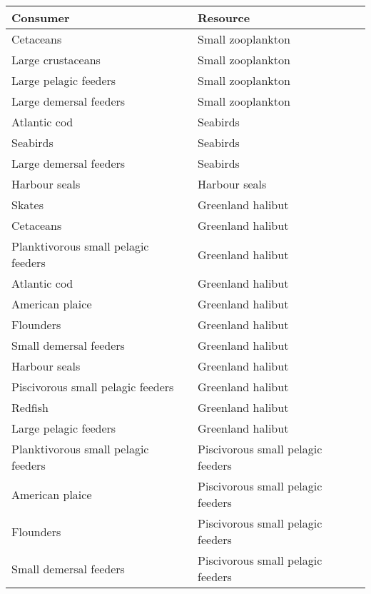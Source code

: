 \begin{table}[h!]
  \centering
  \begin{tabular}{|l|l|}
      \hline
      Consumer               & Resource \\
      \hline    \hline
      Cetaceans                           & Small zooplankton \\
      Large crustaceans                   & Small zooplankton \\
      Large pelagic feeders               & Small zooplankton \\
      Large demersal feeders              & Small zooplankton \\
      Atlantic cod                        & Seabirds  \\
      Seabirds                            & Seabirds  \\
      Large demersal feeders              & Seabirds  \\
      Harbour seals                       & Harbour seals \\
      Skates                              & Greenland halibut \\
      Cetaceans                           & Greenland halibut \\
      Planktivorous small pelagic feeders & Greenland halibut \\
      Atlantic cod                        & Greenland halibut \\
      American plaice                     & Greenland halibut \\
      Flounders                           & Greenland halibut \\
      Small demersal feeders              & Greenland halibut \\
      Harbour seals                       & Greenland halibut \\
      Piscivorous small pelagic feeders   & Greenland halibut \\
      Redfish                             & Greenland halibut \\
      Large pelagic feeders               & Greenland halibut \\
      Planktivorous small pelagic feeders & Piscivorous small pelagic feeders \\
      American plaice                     & Piscivorous small pelagic feeders \\
      Flounders                           & Piscivorous small pelagic feeders \\
      Small demersal feeders              & Piscivorous small pelagic feeders \\

\end{tabular}
\end{table}
